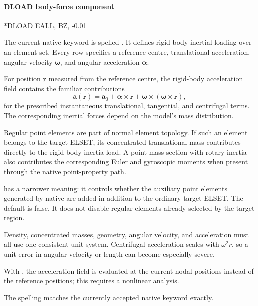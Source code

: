 \paragraph*{DLOAD body-force component}
\begin{inputdeck}
*DLOAD
EALL, BZ, -0.01
\end{inputdeck}


The current native keyword is spelled . It defines rigid-body inertial loading over an element set. Every row specifies a reference centre, translational acceleration, angular velocity \(\boldsymbol\omega\), and angular acceleration \(\boldsymbol\alpha\).

For position \(\boldsymbol r\) measured from the reference centre, the rigid-body acceleration field contains the familiar contributions
\[
\boldsymbol a(\boldsymbol r)
=
\boldsymbol a_0
+\boldsymbol\alpha\times\boldsymbol r
+\boldsymbol\omega\times(\boldsymbol\omega\times\boldsymbol r),
\]
for the prescribed instantaneous translational, tangential, and centrifugal terms. The corresponding inertial forces depend on the model's mass distribution.

Regular  point elements are part of normal element topology. If such an element belongs to the target ELSET, its concentrated translational mass contributes directly to the rigid-body inertia load. A point-mass section with rotary inertia also contributes the corresponding Euler and gyroscopic moments when present through the native point-property path.

 has a narrower meaning: it controls whether the auxiliary point elements generated by native  are added in addition to the ordinary target ELSET. The default is false. It does not disable regular  elements already selected by the target region.

Density, concentrated masses, geometry, angular velocity, and acceleration must all use one consistent unit system. Centrifugal acceleration scales with \(\omega^2 r\), so a unit error in angular velocity or length can become especially severe.

With , the acceleration field is evaluated at the current nodal positions instead of the reference positions; this requires a nonlinear analysis.

The spelling  matches the currently accepted native keyword exactly.

